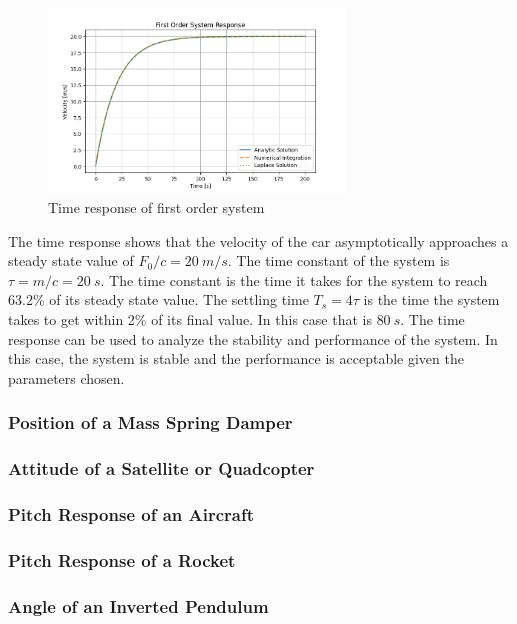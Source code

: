 \begin{figure}[H]
    \centering
    \includegraphics[width=0.7\textwidth]{Figures/first_order_response.png}
    \caption{Time response of first order system}
    \label{f:first_order_response}
\end{figure}
\noindent The time response shows that the velocity of the car asymptotically approaches a steady state value of $F_0/c = 20~m/s$. The time constant of the system is $\tau = m/c = 20~s$. The time constant is the time it takes for the system to reach 63.2\% of its steady state value. The settling time $T_s=4\tau$ is the time the system takes to get within 2\% of its final value. In this case that is $80~s$. The time response can be used to analyze the stability and performance of the system. In this case, the system is stable and the performance is acceptable given the parameters chosen. 

\subsubsection{Position of a Mass Spring Damper}

\subsubsection{Attitude of a Satellite or Quadcopter}

\subsubsection{Pitch Response of an Aircraft}

\subsubsection{Pitch Response of a Rocket}

\subsubsection{Angle of an Inverted Pendulum}


